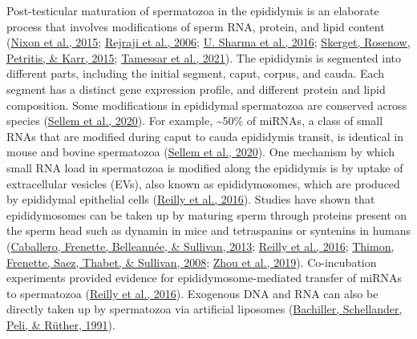 \documentclass[12pt,twoside]{reedthesis}
\begin{document}
Post-testicular maturation of spermatozoa in the epididymis is an
elaborate process that involves modifications of sperm RNA, protein, and
lipid content (\protect\hyperlink{ref-nixon_2015}{Nixon et al., 2015}; \protect\hyperlink{ref-rejraji_2006}{Rejraji et al., 2006}; \protect\hyperlink{ref-sharma_2016}{U. Sharma et al., 2016}; \protect\hyperlink{ref-skerget_2015}{Skerget, Rosenow, Petritis, \& Karr, 2015}; \protect\hyperlink{ref-tamessar_2021}{Tamessar et al., 2021}). The epididymis is segmented into different parts,
including the initial segment, caput, corpus, and cauda. Each segment
has a distinct gene expression profile, and different protein and lipid
composition. Some modifications in epididymal spermatozoa are conserved
across species (\protect\hyperlink{ref-sellem_2020}{Sellem et al., 2020}). For example, \textasciitilde50\% of miRNAs, a class of
small RNAs that are modified during caput to cauda epididymis transit,
is identical in mouse and bovine spermatozoa (\protect\hyperlink{ref-sellem_2020}{Sellem et al., 2020}). One
mechanism by which small RNA load in spermatozoa is modified along the
epididymis is by uptake of extracellular vesicles (EVs), also known as
epididymosomes, which are produced by epididymal epithelial cells
(\protect\hyperlink{ref-reilly_2016}{Reilly et al., 2016}). Studies have shown that epididymosomes can be taken up
by maturing sperm through proteins present on the sperm head such as
dynamin in mice and tetraspanins or syntenins in humans
(\protect\hyperlink{ref-caballero_2013}{Caballero, Frenette, Belleannée, \& Sullivan, 2013}; \protect\hyperlink{ref-reilly_2016}{Reilly et al., 2016}; \protect\hyperlink{ref-thimon_2008}{Thimon, Frenette, Saez, Thabet, \& Sullivan, 2008}; \protect\hyperlink{ref-zhou_2019}{Zhou et al., 2019}). Co-incubation
experiments provided evidence for epididymosome-mediated transfer of
miRNAs to spermatozoa (\protect\hyperlink{ref-reilly_2016}{Reilly et al., 2016}). Exogenous DNA and RNA can also be
directly taken up by spermatozoa via artificial liposomes
(\protect\hyperlink{ref-bachiller_1991}{Bachiller, Schellander, Peli, \& Rüther, 1991}).
\end{document}
